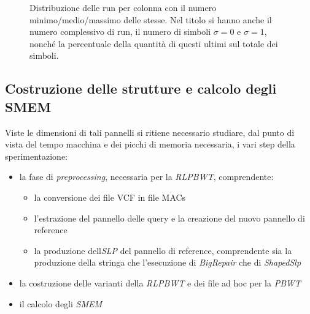\begin{figure}
\begin{subfigure}{.45\textwidth}
  \end{subfigure}
  \caption{Distribuzione delle run per colonna con il numero
    minimo/medio/massimo delle stesse. Nel titolo si hanno anche il numero
    complessivo di run, il numero di simboli $\sigma=0$ e $\sigma=1$, nonché la
    percentuale della quantità di questi ultimi sul totale dei simboli.}
  \label{fig:chrrun}
\end{figure}
\subsection{Costruzione delle strutture e calcolo degli SMEM}
Viste le dimensioni di tali pannelli si ritiene necessario studiare, dal punto
di vista del tempo macchina e dei picchi di memoria necessaria, i vari step
della sperimentazione:
\begin{itemize}
  \item la fase di \textit{preprocessing}, necessaria per la \textit{RLPBWT},
  comprendente: 
  \begin{itemize}
    \item la conversione dei file VCF in file MACs
    \item l'estrazione del pannello delle query e la creazione del nuovo
    pannello di reference
    \item la produzione dell\textit{SLP} del pannello di reference, comprendente
    sia la produzione della stringa che l'esecuzione di \textit{BigRepair} che
    di \textit{ShapedSlp}
  \end{itemize}
  \item la costruzione delle varianti della \textit{RLPBWT} e dei file ad hoc
  per la \textit{PBWT}
  \item il calcolo degli \textit{SMEM}
\end{itemize}
